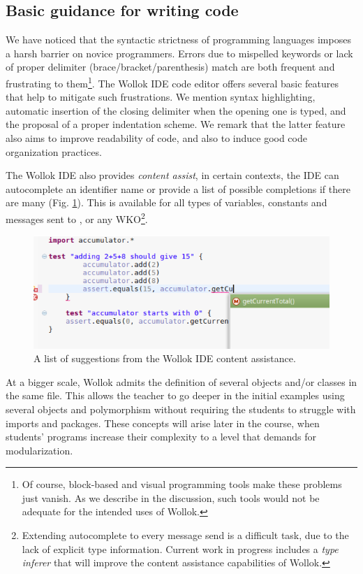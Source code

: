 \subsection{Basic guidance for writing code}
We have noticed that the syntactic strictness of programming languages imposes a harsh barrier on novice programmers. 
Errors due to mispelled keywords or lack of proper delimiter (brace/bracket/parenthesis) match are both frequent and frustrating to them\footnote{Of course, block-based and visual programming tools make these problems just vanish. As we describe in the discussion, such tools would not be adequate for the intended uses of Wollok.}.
The Wollok IDE code editor offers several basic features that help to mitigate such frustrations. We mention syntax highlighting, automatic insertion of the closing delimiter when the opening one is typed, and the proposal of a proper indentation scheme. We remark that the latter feature also aims to improve readability of code, and also to induce good code organization practices.

The Wollok IDE also provides \emph{content assist}, 
\ie in certain contexts, the IDE can autocomplete an identifier name or provide a list of possible completions if there are many (\cf Fig. \ref{fig:codeCompletion}).
This is available for all types of variables, constants and messages sent to ,  or any WKO\footnote{Extending autocomplete to every message send is a difficult task, due to the lack of explicit type information. 
Current work in progress includes a \emph{type inferer} that will improve the content assistance capabilities of Wollok.}. 
 
\begin{figure}[ht]
 \centering
 \includegraphics[scale=0.45]{images/codeCompletion.png}
 \caption{\small A list of suggestions from the Wollok IDE content assistance.}
 \label{fig:codeCompletion}
\end{figure}

At a bigger scale, Wollok admits the definition of several objects and/or classes in the same file. 
This allows the teacher to go deeper in the initial examples using several objects and polymorphism without requiring the students to struggle with imports and packages.
These concepts will arise later in the course, when students' programs increase their complexity to a level that demands for modularization. 


